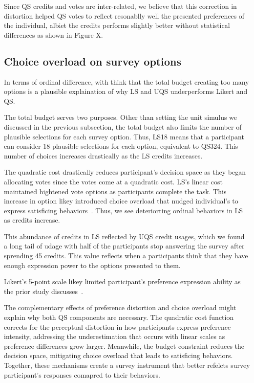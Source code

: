 Since QS credits and votes are inter-related, we believe that this correction in distortion helped QS votes to reflect resonablly well the presented preferences of the individual, albiet the credits performs slightly better without statistical differences as shown in Figure X.

\subsection{Choice overload on survey options}
In terms of ordinal difference, with think that the total budget creating too many options is a plausible explaination of why LS and UQS underperforms Likert and QS.

The total budget serves two purposes. Other than setting the unit simulus we discussed in the previous subsection, the total budget also limits the number of plausible selections for each survey option. Thus, LS18 means that a participant can consider 18 plausible selections for each option, equivalent to QS324. This number of choices increases drastically as the LS credits increases.

The quadratic cost drastically reduces participant's decision space as they began allocating votes since the votes come at a quadratic cost. LS's linear cost maintained hightened vote options as participants complete the task. This increase in option likey introduced choice overload that nudged individual's to express satisficing behaviors~\cite{}. Thus, we see deteriorting ordinal behaviors in LS as credits increase.

This abundance of credits in LS reflected by UQS credit usages, which we found a long tail of udage with half of the participants stop answering the survey after sprending 45 credits. This value reflects when a participants think that they have enough expression power to the options presented to them.

Likert's 5-point scale likey limited participant's preference expression ability as the prior study discusses~\cite{chengCanShowWhat2021}.

The complementary effects of preference distortion and choice overload might explain why both QS components are necessary. The quadratic cost function corrects for the perceptual distortion in how participants express preference intensity, addressing the underestimation that occurs with linear scales as preference differences grow larger. Meanwhile, the budget constraint reduces the decision space, mitigating choice overload that leads to satisficing behaviors.  Together, these mechanisms create a survey instrument that better refelcts survey participant's responses comapred to their behaviors.


